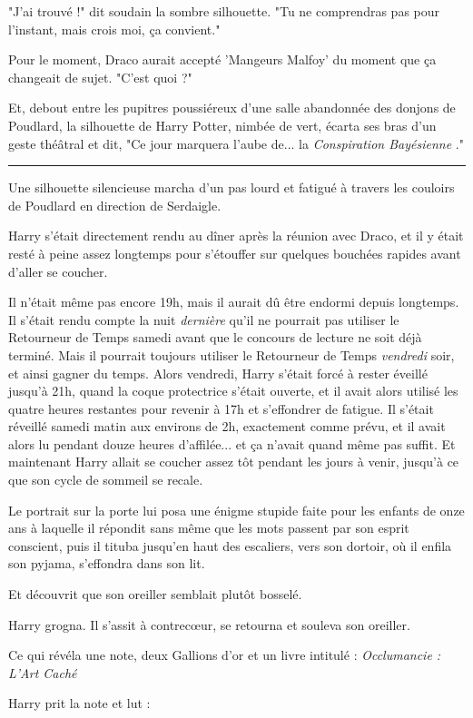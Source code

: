 "J'ai trouvé !" dit soudain la sombre silhouette. "Tu ne comprendras pas pour l'instant, mais crois moi, ça convient."

Pour le moment, Draco aurait accepté 'Mangeurs Malfoy' du moment que ça changeait de sujet. "C'est quoi ?"

Et, debout entre les pupitres poussiéreux d'une salle abandonnée des donjons de Poudlard, la silhouette de Harry Potter, nimbée de vert, écarta ses bras d'un geste théâtral et dit, "Ce jour marquera l'aube de... la \emph{Conspiration Bayésienne} ."
\par\noindent\rule{\textwidth}{0.4pt}
Une silhouette silencieuse marcha d'un pas lourd et fatigué à travers les couloirs de Poudlard en direction de Serdaigle.

Harry s'était directement rendu au dîner après la réunion avec Draco, et il y était resté à peine assez longtemps pour s'étouffer sur quelques bouchées rapides avant d'aller se coucher.

Il n'était même pas encore 19h, mais il aurait dû être endormi depuis longtemps. Il s'était rendu compte la nuit \emph{dernière}  qu'il ne pourrait pas utiliser le Retourneur de Temps samedi avant que le concours de lecture ne soit déjà terminé. Mais il pourrait toujours utiliser le Retourneur de Temps \emph{vendredi}  soir, et ainsi gagner du temps. Alors vendredi, Harry s'était forcé à rester éveillé jusqu'à 21h, quand la coque protectrice s'était ouverte, et il avait alors utilisé les quatre heures restantes pour revenir à 17h et s'effondrer de fatigue. Il s'était réveillé samedi matin aux environs de 2h, exactement comme prévu, et il avait alors lu pendant douze heures d'affilée... et ça n'avait quand même pas suffit. Et maintenant Harry allait se coucher assez tôt pendant les jours à venir, jusqu'à ce que son cycle de sommeil se recale.

Le portrait sur la porte lui posa une énigme stupide faite pour les enfants de onze ans à laquelle il répondit sans même que les mots passent par son esprit conscient, puis il tituba jusqu'en haut des escaliers, vers son dortoir, où il enfila son pyjama, s'effondra dans son lit.

Et découvrit que son oreiller semblait plutôt bosselé.

Harry grogna. Il s'assit à contrecœur, se retourna et souleva son oreiller.

Ce qui révéla une note, deux Gallions d'or et un livre intitulé : \emph{Occlumancie : L'Art Caché} 

Harry prit la note et lut :

